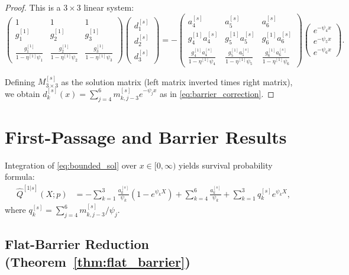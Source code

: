 \documentclass[11pt,a4paper]{article}
\numberwithin{equation}{section}
\begin{document}
\begin{appendices}
\begin{proof}
This is a $3 \times 3$ linear system:
\begin{equation}
\begin{pmatrix}
1 & 1 & 1 \\
g^{[1]}_1 & g^{[1]}_2 & g^{[1]}_3 \\
\frac{g^{[1]}_1}{1-\eta^{[1]}\psi_1} & \frac{g^{[1]}_2}{1-\eta^{[1]}\psi_2} & \frac{g^{[1]}_3}{1-\eta^{[1]}\psi_3}
\end{pmatrix}
\begin{pmatrix} d^{[s]}_1 \\ d^{[s]}_2 \\ d^{[s]}_3 \end{pmatrix}
= -\begin{pmatrix}
a^{[s]}_4 & a^{[s]}_5 & a^{[s]}_6 \\
g^{[1]}_4 a^{[s]}_4 & g^{[1]}_5 a^{[s]}_5 & g^{[1]}_6 a^{[s]}_6 \\
\frac{g^{[1]}_4 a^{[s]}_4}{1-\eta^{[1]}\psi_4} & \frac{g^{[1]}_5 a^{[s]}_5}{1-\eta^{[1]}\psi_5} & \frac{g^{[1]}_6 a^{[s]}_6}{1-\eta^{[1]}\psi_6}
\end{pmatrix}
\begin{pmatrix} e^{-\psi_4 x} \\ e^{-\psi_5 x} \\ e^{-\psi_6 x} \end{pmatrix}.
\end{equation}

Defining $M^{[s]}_{3 \times 3}$ as the solution matrix (left matrix inverted times right matrix), we obtain $d^{[s]}_k(x) = \sum_{j=4}^6 m^{[s]}_{k,j-3} e^{-\psi_j x}$ as in \eqref{eq:barrier_correction}.
\end{proof}


\section{First-Passage and Barrier Results}\label{app:barrier_results}


Integration of \eqref{eq:bounded_sol} over $x \in [0, \infty)$ yields survival probability formula:
\begin{align}
\hat{Q}^{[1|s]}(X; p) &= -\sum_{k=1}^3 \frac{a^{[s]}_k}{\psi_k}\left(1 - e^{\psi_k X}\right) + \sum_{k=4}^6 \frac{a^{[s]}_k}{\psi_k} + \sum_{k=1}^3 q^{[s]}_k e^{\psi_k X}, \label{eq:Q_formula}
\end{align}
where $q^{[s]}_k = \sum_{j=4}^6 m^{[s]}_{k,j-3}/\psi_j$.




\subsection{Flat-Barrier Reduction (Theorem~\ref{thm:flat_barrier})}\label{app:flat_barrier}


\end{appendices}
\end{document}
